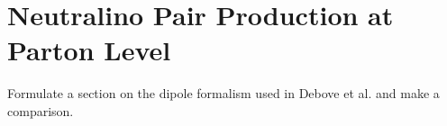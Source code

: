 \documentclass[../main.tex]{subfiles}
\begin{document}
\begin{temporary}
  \\
\end{temporary}

\chapter{Neutralino Pair Production at Parton Level}
\label{chap:part}

\begin{TODO}
  \item Formulate a section on the dipole formalism used in Debove et al.
  and make a
  comparison.
\end{TODO}
\end{document}
